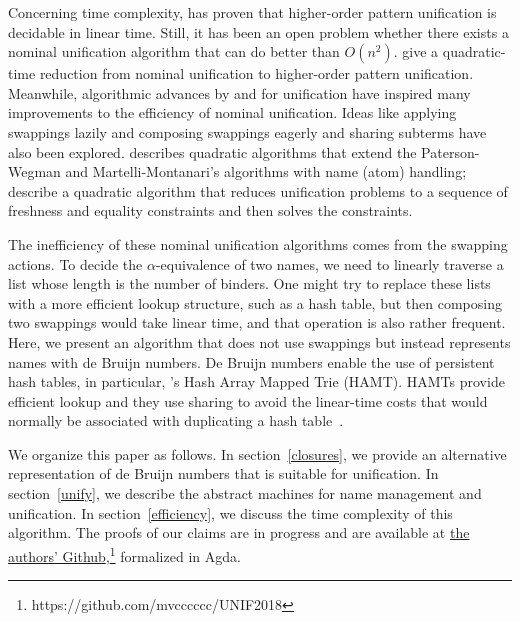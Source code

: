 \documentclass[a4paper,UKenglish]{lipics-v2016}
\begin{document}
Concerning time complexity, \citet{qian_unification_1996} has proven that
higher-order pattern unification is decidable in linear time.
Still, it has been an open problem whether there exists a nominal
unification algorithm that can do better than
$O(n^2)$. \citet{levy_nominal_2012} give a quadratic-time reduction
from nominal unification to higher-order pattern unification.
Meanwhile, algorithmic advances by \citet{paterson_linear_1978} and
\citet{martelli_efficient_1982} for unification have inspired many
improvements to the efficiency of nominal unification. Ideas
like applying swappings lazily and composing swappings eagerly and
sharing subterms have also been explored. \citet{calves_complexity_2010}
describes quadratic algorithms that extend the Paterson-Wegman and
Martelli-Montanari's algorithms with name (atom) handling;
\citet{levy_efficient_2010} describe a quadratic algorithm that
reduces unification problems to a sequence of freshness and equality
constraints and then solves the constraints.

The inefficiency of these nominal unification algorithms comes from
the swapping actions. To decide the $\alpha$-equivalence of
two names, we need to linearly traverse a list whose length 
is the number of binders.  One might try to replace these
lists with a more efficient lookup structure, such as a hash table,
but then composing two swappings would take linear time, and that
operation is also rather frequent.  Here, we present an algorithm that
does not use swappings but instead represents names with de Bruijn
numbers. De Bruijn numbers enable the use of persistent hash tables, in
particular, \citeauthor{bagwell_ideal_2001}'s Hash Array Mapped Trie
(HAMT). HAMTs provide efficient lookup and
they use sharing to avoid the linear-time costs that would normally be
associated with duplicating a hash table~\citep{bagwell_ideal_2001}.

We organize this paper as follows.  In section~\ref{closures}, we provide
an alternative representation of de Bruijn numbers that is suitable
for unification.  In section~\ref{unify}, we describe the abstract
machines for name management and unification.  In
section~\ref{efficiency}, we discuss the time complexity of this
algorithm. The proofs of our claims are in progress and are available
at \href{https://github.com/mvcccccc/UNIF2018}{the authors' Github},\footnote{https://github.com/mvcccccc/UNIF2018}
formalized in Agda.
  
\end{document}
